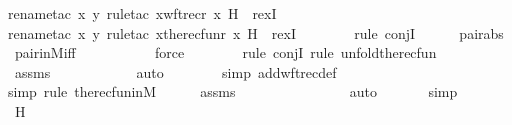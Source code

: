 \begin{isabellebody}
{\isacharparenleft}{\kern0pt}rename{\isacharunderscore}{\kern0pt}tac\ x\ y{\isacharcomma}{\kern0pt}\ rule{\isacharunderscore}{\kern0pt}tac\ x{\isacharequal}{\kern0pt}{\isachardoublequoteopen}wftrec{\isacharparenleft}{\kern0pt}r{\isacharcomma}{\kern0pt}\ x{\isacharcomma}{\kern0pt}\ H{\isacharparenright}{\kern0pt}{\isachardoublequoteclose}\ \ rexI{\isacharparenright}{\kern0pt}\isanewline
\ \ \ \ \ \ \isamarkupfalse%
{\isacharparenleft}{\kern0pt}rename{\isacharunderscore}{\kern0pt}tac\ x\ y{\isacharcomma}{\kern0pt}\ rule{\isacharunderscore}{\kern0pt}tac\ x{\isacharequal}{\kern0pt}{\isachardoublequoteopen}the{\isacharunderscore}{\kern0pt}recfun{\isacharparenleft}{\kern0pt}r{\isacharcomma}{\kern0pt}\ x{\isacharcomma}{\kern0pt}\ H{\isacharparenright}{\kern0pt}{\isachardoublequoteclose}\ \ rexI{\isacharparenright}{\kern0pt}\isanewline
\ \ \ \ \ \ \ \isamarkupfalse%
{\isacharparenleft}{\kern0pt}rule\ conjI{\isacharparenright}{\kern0pt}\isanewline
\ \ \ \ \isamarkupfalse%
\ pair{\isacharunderscore}{\kern0pt}abs\ \isamarkupfalse%
\ pair{\isacharunderscore}{\kern0pt}in{\isacharunderscore}{\kern0pt}M{\isacharunderscore}{\kern0pt}iff\ \isanewline
\ \ \ \ \ \ \ \ \isamarkupfalse%
\ force\isanewline
\ \ \ \ \ \ \ \isamarkupfalse%
{\isacharparenleft}{\kern0pt}rule\ conjI{\isacharcomma}{\kern0pt}\ rule\ unfold{\isacharunderscore}{\kern0pt}the{\isacharunderscore}{\kern0pt}recfun{\isacharparenright}{\kern0pt}\isanewline
\ \ \ \ \isamarkupfalse%
\ assms\ \isanewline
\ \ \ \ \ \ \ \ \ \isamarkupfalse%
\ auto{\isacharbrackleft}{\kern0pt}{}{\isacharbrackright}{\kern0pt}\isanewline
\ \ \ \ \ \ \ \isamarkupfalse%
{\isacharparenleft}{\kern0pt}simp\ add{\isacharcolon}{\kern0pt}wftrec{\isacharunderscore}{\kern0pt}def{\isacharparenright}{\kern0pt}\isanewline
\ \ \ \ \ \ \isamarkupfalse%
{\isacharparenleft}{\kern0pt}simp{\isacharcomma}{\kern0pt}\ rule\ the{\isacharunderscore}{\kern0pt}recfun{\isacharunderscore}{\kern0pt}in{\isacharunderscore}{\kern0pt}M{\isacharparenright}{\kern0pt}\isanewline
\ \ \ \ \isamarkupfalse%
\ assms\ \isanewline
\ \ \ \ \ \ \ \ \ \ \ \ \ \isamarkupfalse%
\ auto{\isacharbrackleft}{\kern0pt}{}{\isacharbrackright}{\kern0pt}\isanewline
\ \ \ \ \ \isamarkupfalse%
\ simp\isanewline
\ \ \ \ \isamarkupfalse%
\ H\ \isanewline
\ \ \ \ \isamarkupfalse%

\end{isabellebody}
